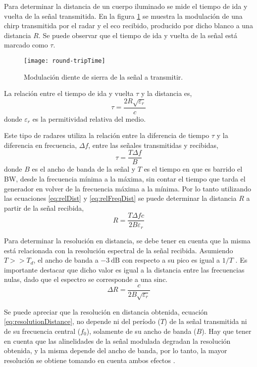 Para determinar la distancia de un cuerpo iluminado se mide el tiempo de ida y vuelta de la señal transmitida. En la figura \ref{fig:roundTripTime} se muestra la modulación de una chirp transmitida por el radar y el eco recibido, producido por dicho blanco a una distancia $R$. Se puede observar que el tiempo de ida y vuelta de la señal está marcado como $\tau$.

\begin{figure}
 \centering
 \texttt{[image: round-tripTime]}
 \caption{Modulación diente de sierra de la señal a transmitir.}
 \label{fig:roundTripTime}
\end{figure}

La relación entre el tiempo de ida y vuelta $\tau$ y la distancia es,
\begin{equation}\label{eq:relDist}
  \tau = \dfrac{2R\sqrt{\varepsilon_r}}{c}
\end{equation}
donde $\varepsilon_r$ es la permitividad relativa del medio.

Este tipo de radares utiliza la relación entre la diferencia de tiempo $\tau$ y la diferencia en frecuencia, $\Delta f$, entre las señales transmitidas y recibidas,
\begin{equation}\label{eq:relFreqDist}
  \tau = \dfrac{T\Delta f}{B}
\end{equation}
donde $B$ es el ancho de banda de la señal y $T$ es el tiempo en que es barrido el BW, desde la frecuencia mínima a la máxima, sin contar el tiempo que tarda el generador en volver de la frecuencia máxima a la mínima. Por lo tanto utilizando las ecuaciones \ref{eq:relDist} y \ref{eq:relFreqDist} se puede determinar la distancia $R$ a partir de la señal recibida,
\begin{equation}\label{eq:receivedDist}
  R = \dfrac{T\Delta fc}{2B\varepsilon_r}
\end{equation}

Para determinar la resolución en distancia, se debe tener en cuenta que la misma está relacionada con la resolución espectral de la señal recibida. Asumiendo $T >> T_d$, el ancho de banda a $\SI{-3}{\dB}$ con respecto a su pico es igual a $1/T$ \cite{Brooker2005}. Es importante destacar que dicho valor es igual a la distancia entre las frecuencias nulas, dado que el espectro se corresponde a una sinc.
\begin{equation}\label{eq:resolutionDistance}
  \Delta R = \dfrac{c}{2B\sqrt{\varepsilon_r}}
\end{equation}

Se puede apreciar que la resolución en distancia obtenida, ecuación \ref{eq:resolutionDistance}, no depende ni del período ($T$) de la señal transmitida ni de su frecuencia central ($f_0$), solamente de su ancho de banda ($B$). Hay que tener en cuenta que las alinelidades de la señal modulada degradan la resolución obtenida, y la misma depende del ancho de banda, por lo tanto, la mayor resolución se obtiene tomando en cuenta ambos efectos \cite{Brooker2005}.

